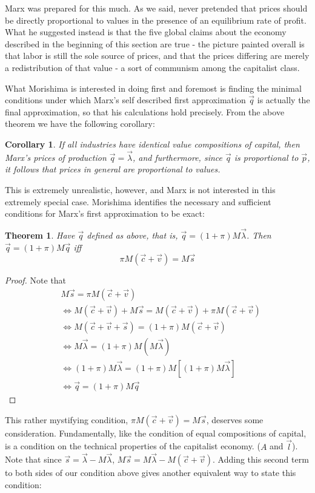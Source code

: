 \documentclass{article}
\theoremstyle{definition}
\theoremstyle{plain}
\theoremstyle{theorem}
\newtheorem{theorem}{Theorem}[section]
\newtheorem{corollary}{Corollary}[section]
\begin{document}
Marx was prepared for this much. As we said, never pretended that prices should be directly proportional to values in the presence of an equilibrium rate of profit. What he suggested instead is that the five global claims about the economy described in the beginning of this section are true - the picture painted overall is that labor is still the sole source of prices, and that the prices differing are merely a redistribution of that value - a sort of communism among the capitalist class. \par 
What Morishima is interested in doing first and foremost is finding the minimal conditions under which Marx's self described first approximation $\vec{q}$ is actually the final approximation, so that his calculations hold precisely. From the above theorem we have the following corollary:
\begin{corollary}
	If all industries have identical value compositions of capital, then Marx's prices of production $\vec{q} = \vec{\lambda}$, and furthermore, since $\vec{q}$ is proportional to $\vec{p}$, it follows that prices in general are proportional to values. 
\end{corollary}
This is extremely unrealistic, however, and Marx is not interested in this extremely special case. Morishima identifies the necessary and sufficient conditions for Marx's first approximation to be exact:
\begin{theorem}
	Have $\vec{q}$ defined as above, that is, $\vec{q} = (1+\pi)M\vec{\lambda}$. Then $\vec{q} = (1+\pi)M\vec{q}$ iff 
	\[ \pi M(\vec{c}+\vec{v}) = M\vec{s} \]
\end{theorem}
\begin{proof}
	Note that
	\begin{align*}
		& M\vec{s} = \pi M(\vec{c}+\vec{v}) \\
		&\iff M(\vec{c}+\vec{v})+M\vec{s} = M(\vec{c}+\vec{v}) + \pi M(\vec{c}+\vec{v}) \\
		&\iff M(\vec{c}+\vec{v}+\vec{s}) = (1+\pi)M(\vec{c}+\vec{v}) \\
		&\iff M\vec{\lambda} = (1+\pi)M(M\vec{\lambda}) \\
		&\iff (1+\pi)M\vec{\lambda} = (1+\pi)M[(1+\pi)M\vec{\lambda}] \\
		&\iff \vec{q} = (1+\pi)M\vec{q}  
	\end{align*}
\end{proof}
This rather mystifying condition, $\pi M(\vec{c}+\vec{v}) = M\vec{s}$, deserves some consideration. Fundamentally, like the condition of equal compositions of capital, is a condition on the technical properties of the capitalist economy. ($A$ and $\vec{l}$). Note that since $\vec{s} = \vec{\lambda} - M\vec{\lambda}$, $M\vec{s} = M\vec{\lambda} - M(\vec{c}+\vec{v})$. Adding this second term to both sides of our condition above gives another equivalent way to state this condition:
\end{document}
